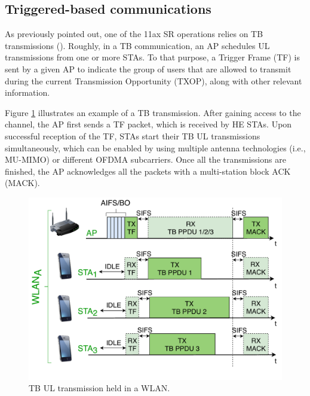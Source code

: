 \documentclass[preprint,12pt]{elsarticle}
\begin{document}
	\subsection{Triggered-based communications}
	\label{section:tb_communication}
	As previously pointed out, one of the 11ax SR operations relies on TB transmissions (\citealp{bellalta2019ap}). Roughly, in a TB communication, an AP schedules UL transmissions from one or more STAs. To that purpose, a Trigger Frame (TF) is sent by a given AP to indicate the group of users that are allowed to transmit during the current Transmission Opportunity (TXOP), along with other relevant information. 
	
	Figure \ref{fig:TB_transmission_example} illustrates an example of a TB transmission. After gaining access to the channel, the AP first sends a TF packet, which is received by HE STAs. Upon successful reception of the TF, STAs start their TB UL transmissions simultaneously, which can be enabled by using multiple antenna technologies (i.e., MU-MIMO) or different OFDMA subcarriers. Once all the transmissions are finished, the AP acknowledges all the packets with a multi-station block ACK (MACK).
	
	\begin{figure}[ht!]
		\centering
		\includegraphics[width=0.45\columnwidth]{fig_8}
		\caption{TB UL transmission held in a WLAN.}
		\label{fig:TB_transmission_example}
	\end{figure}
	
	
\end{document}

